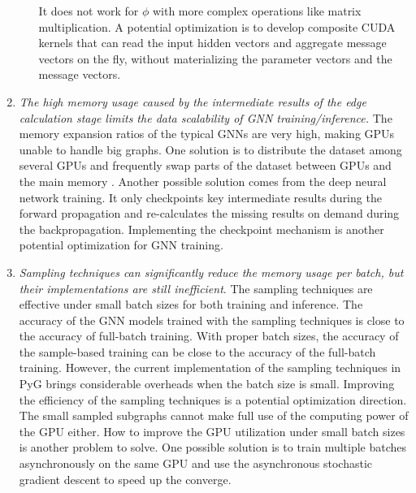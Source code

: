\begin{enumerate}
\begin{itemize}
                    It does not work for $\phi$ with more complex operations like matrix multiplication.
                    A potential optimization is to develop composite CUDA kernels that can read the input hidden vectors and aggregate message vectors on the fly, without materializing the parameter vectors and the message vectors.
         \end{itemize}
    \item \emph{The high memory usage caused by the intermediate results of the edge calculation stage limits the data scalability of GNN training/inference.}
          The memory expansion ratios of the typical GNNs are very high, making GPUs unable to handle big graphs.
          One solution is to distribute the dataset among several GPUs and frequently swap parts of the dataset between GPUs and the main memory \cite{ma2019_neugraph}.
          Another possible solution \cite{chen2016_training_deep} comes from the deep neural network training. %
          It only checkpoints key intermediate results during the forward propagation and re-calculates the missing results on demand during the backpropagation.
          Implementing the checkpoint mechanism is another potential optimization for GNN training.

    \item \emph{Sampling techniques can significantly reduce the memory usage per batch, but their implementations are still inefficient}.
          The sampling techniques are effective under small batch sizes for both training and inference.
          The accuracy of the GNN models trained with the sampling techniques is close to the accuracy of full-batch training.
          With proper batch sizes, the accuracy of the sample-based training can be close to the accuracy of the full-batch training.
          However, the current implementation of the sampling techniques in PyG brings considerable overheads when the batch size is small.
          Improving the efficiency of the sampling techniques is a potential optimization direction.
          The small sampled subgraphs cannot make full use of the computing power of the GPU either.
          How to improve the GPU utilization under small batch sizes is another problem to solve.
          One possible solution is to train multiple batches asynchronously on the same GPU and use the asynchronous stochastic gradient descent to speed up the converge.
\end{enumerate}
